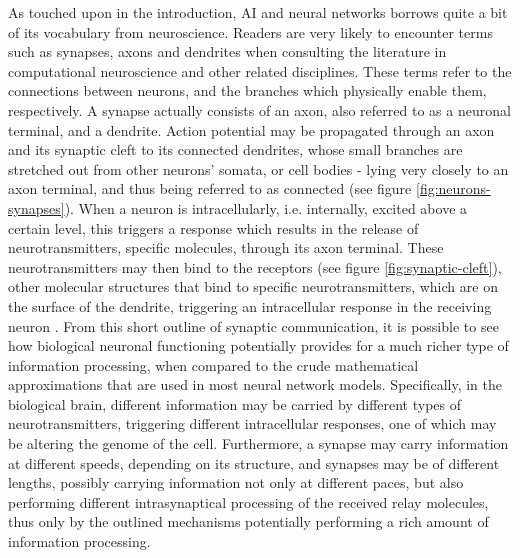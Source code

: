 As touched upon in the introduction, AI and neural networks borrows quite a bit of its vocabulary from neuroscience. Readers are very likely to encounter terms such as synapses, axons and dendrites when consulting the literature in computational neuroscience and other related disciplines. These terms refer to the connections between neurons, and the branches which physically enable them, respectively. A synapse actually consists of an axon, also referred to as a neuronal terminal, and a dendrite. Action potential may be propagated through an axon and its synaptic cleft to its connected dendrites, whose small branches are stretched out from other neurons' somata, or cell bodies - lying very closely to an axon terminal, and thus being referred to as connected (see figure \ref{fig:neurons-synapses}). When a neuron is intracellularly, i.e. internally, excited above a certain level, this triggers a response which results in the release of neurotransmitters, specific molecules, through its axon terminal. These neurotransmitters may then bind to the receptors (see figure \ref{fig:synaptic-cleft}), other molecular structures that bind to specific neurotransmitters, which are on the surface of the dendrite, triggering an intracellular response in the receiving neuron \citep{Campbell2010chpt9}. From this short outline of synaptic communication, it is possible to see how biological neuronal functioning potentially provides for a much richer type of information processing, when compared to the crude mathematical approximations that are used in most neural network models. Specifically, in the biological brain, different information may be carried by different types of neurotransmitters, triggering different intracellular responses, one of which may be altering the genome of the cell. Furthermore, a synapse may carry information at different speeds, depending on its structure, and synapses may be of different lengths, possibly carrying information not only at different paces, but also performing different intrasynaptical processing of the received relay molecules, thus only by the outlined mechanisms potentially performing a rich amount of information processing.

